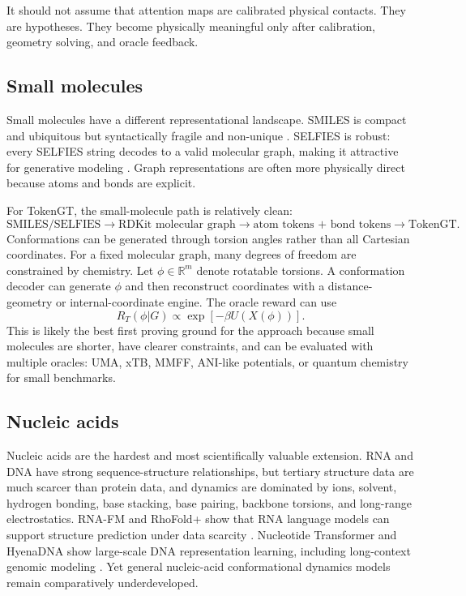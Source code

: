 \documentclass[11pt]{article}
\newcommand{\R}{\mathbb{R}}
\newcommand{\tokgt}{\mathrm{TokenGT}}
\begin{document}
It should not assume that attention maps are calibrated physical contacts. They are hypotheses. They become physically meaningful only after calibration, geometry solving, and oracle feedback.

\subsection{Small molecules}

Small molecules have a different representational landscape. SMILES is compact and ubiquitous but syntactically fragile and non-unique \cite{weininger1988smiles}. SELFIES is robust: every SELFIES string decodes to a valid molecular graph, making it attractive for generative modeling \cite{krenn2020selfies}. Graph representations are often more physically direct because atoms and bonds are explicit.

For TokenGT, the small-molecule path is relatively clean:
\[
\text{SMILES/SELFIES}\to\text{RDKit molecular graph}\to
\text{atom tokens + bond tokens}\to\tokgt.
\]
Conformations can be generated through torsion angles rather than all Cartesian coordinates. For a fixed molecular graph, many degrees of freedom are constrained by chemistry. Let $\phi\in\R^m$ denote rotatable torsions. A conformation decoder can generate $\phi$ and then reconstruct coordinates with a distance-geometry or internal-coordinate engine. The oracle reward can use
\[
R_T(\phi|G)\propto\exp[-\beta U(X(\phi))].
\]
This is likely the best first proving ground for the approach because small molecules are shorter, have clearer constraints, and can be evaluated with multiple oracles: UMA, xTB, MMFF, ANI-like potentials, or quantum chemistry for small benchmarks.

\subsection{Nucleic acids}

Nucleic acids are the hardest and most scientifically valuable extension. RNA and DNA have strong sequence-structure relationships, but tertiary structure data are much scarcer than protein data, and dynamics are dominated by ions, solvent, hydrogen bonding, base stacking, base pairing, backbone torsions, and long-range electrostatics. RNA-FM and RhoFold+ show that RNA language models can support structure prediction under data scarcity \cite{shen2024rhofold}. Nucleotide Transformer and HyenaDNA show large-scale DNA representation learning, including long-context genomic modeling \cite{dallatorre2024nt,nguyen2023hyenadna}. Yet general nucleic-acid conformational dynamics models remain comparatively underdeveloped.
\end{document}
